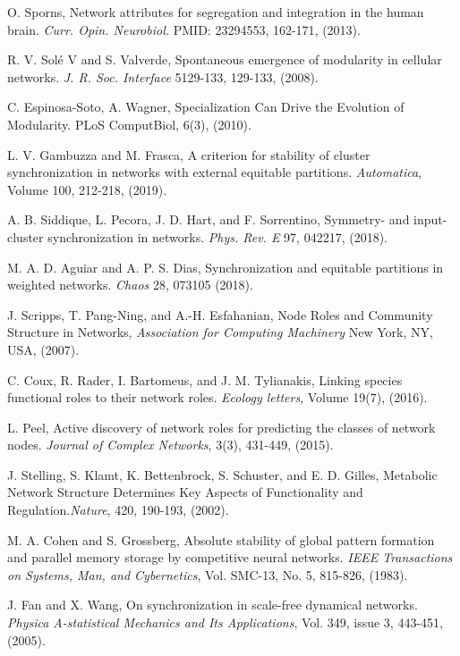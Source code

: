 \documentclass[12pt]{thesis}
\begin{document}
\begin{thebibliography}{99}
 O. Sporns, Network attributes for segregation and integration in the human brain. \textit{Curr. Opin. Neurobiol.} PMID: 23294553, {162-171}, (2013).

 R. V. Solé V and S. Valverde, Spontaneous emergence of modularity in cellular networks. \textit{J. R. Soc. Interface} 5129-133, {129-133}, (2008).

 C. Espinosa-Soto, A. Wagner, Specialization Can Drive the Evolution of Modularity. PLoS ComputBiol, 6(3), (2010).

 L. V. Gambuzza and M. Frasca, A criterion for stability of cluster synchronization in networks with external equitable partitions. \textit{Automatica}, Volume 100, {212-218}, (2019).

 A. B. Siddique, L. Pecora, J. D. Hart, and F. Sorrentino, Symmetry- and input-cluster synchronization in networks. \textit{Phys. Rev. E} 97, 042217, (2018).

 M. A. D. Aguiar and A. P. S. Dias, Synchronization and equitable partitions in weighted networks. \textit{Chaos} 28, {073105} (2018).

 J. Scripps, T. Pang-Ning, and A.-H. Esfahanian, Node Roles and Community Structure in Networks, \textit{Association for Computing Machinery} New York, NY, USA, (2007).

 C. Coux, R. Rader, I. Bartomeus, and J. M. Tylianakis, Linking species functional roles to their network roles. \textit{Ecology letters}, Volume 19(7), (2016).

 L. Peel, Active discovery of network roles for predicting the classes of network nodes. \textit{Journal of Complex Networks}, {3(3), 431-449}, (2015).

 J. Stelling, S. Klamt, K. Bettenbrock, S. Schuster, and E. D. Gilles, Metabolic Network Structure Determines Key Aspects of Functionality and Regulation.\textit{Nature}, {420, 190-193}, (2002).


 M. A. Cohen and S. Grossberg, Absolute stability of global pattern formation and parallel memory storage by competitive neural networks. \textit{IEEE Transactions on Systems, Man, and Cybernetics}, Vol. SMC-13, No. 5, {815-826}, (1983).

 J. Fan and X. Wang, On synchronization in scale-free dynamical networks. \textit{Physica A-statistical Mechanics and Its Applications}, Vol. 349, issue 3, {443-451}, (2005).


\end{thebibliography}
\end{document}
